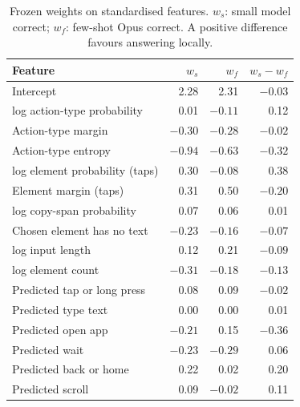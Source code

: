 \documentclass[10pt]{article}
\begin{document}
\begin{table}[!htbp]\centering\small
\caption{Frozen weights on standardised features. $w_s$: small model correct; $w_f$: few-shot Opus correct. A positive difference favours answering locally.}\label{tab:weights}
\begin{tabular}{lrrr}\toprule
Feature & $w_s$ & $w_f$ & $w_s - w_f$\\\midrule
Intercept & 2.28 & 2.31 & $-0.03$\\
log action-type probability & 0.01 & $-0.11$ & 0.12\\
Action-type margin & $-0.30$ & $-0.28$ & $-0.02$\\
Action-type entropy & $-0.94$ & $-0.63$ & $-0.32$\\
log element probability (taps) & 0.30 & $-0.08$ & 0.38\\
Element margin (taps) & 0.31 & 0.50 & $-0.20$\\
log copy-span probability & 0.07 & 0.06 & 0.01\\
Chosen element has no text & $-0.23$ & $-0.16$ & $-0.07$\\
log input length & 0.12 & 0.21 & $-0.09$\\
log element count & $-0.31$ & $-0.18$ & $-0.13$\\
Predicted tap or long press & 0.08 & 0.09 & $-0.02$\\
Predicted type text & 0.00 & 0.00 & 0.01\\
Predicted open app & $-0.21$ & 0.15 & $-0.36$\\
Predicted wait & $-0.23$ & $-0.29$ & 0.06\\
Predicted back or home & 0.22 & 0.02 & 0.20\\
Predicted scroll & 0.09 & $-0.02$ & 0.11\\\bottomrule
\end{tabular}\end{table}
\end{document}
